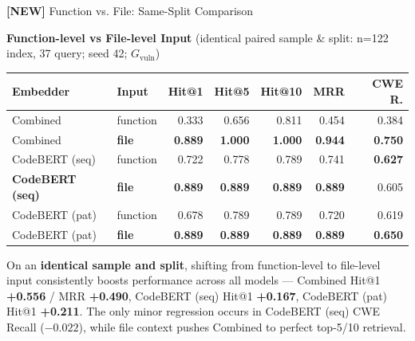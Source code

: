 \documentclass[aspectratio=169,10pt]{beamer}
\begin{document}
\begin{frame}{\textbf{[NEW]} Function vs. File: Same-Split Comparison}

  \begin{center}
    {\small\textbf{Function-level vs File-level Input} {\scriptsize(identical paired sample \& split: n=122 index, 37 query; seed 42; $G_{\mathrm{vuln}}$)}}\\[4pt]
    {\scriptsize
    \renewcommand{\arraystretch}{1.15}
    \setlength{\tabcolsep}{4pt}
    \begin{tabular}{llrrrrr}
      \toprule
      \textbf{Embedder} & \textbf{Input} & \textbf{Hit@1} & \textbf{Hit@5} & \textbf{Hit@10} & \textbf{MRR} & \textbf{CWE R.} \\
      \midrule
      Combined & function & 0.333 & 0.656 & 0.811 & 0.454 & 0.384 \\
      \rowcolor{hit!12}
      Combined & \textbf{file} & \textbf{0.889} & \textbf{1.000} & \textbf{1.000} & \textbf{0.944} & \textbf{0.750} \\
      \midrule
      CodeBERT (seq) & function & 0.722 & 0.778 & 0.789 & 0.741 & \textbf{0.627} \\
      \rowcolor{hit!12}
      \textbf{CodeBERT (seq)} & \textbf{file} & \textbf{0.889} & \textbf{0.889} & \textbf{0.889} & \textbf{0.889} & 0.605 \\
      \midrule
      CodeBERT (pat) & function & 0.678 & 0.789 & 0.789 & 0.720 & 0.619 \\
      \rowcolor{hit!12}
      CodeBERT (pat) & \textbf{file} & \textbf{0.889} & \textbf{0.889} & \textbf{0.889} & \textbf{0.889} & \textbf{0.650} \\
      \bottomrule
    \end{tabular}}
  \end{center}

  \vspace{0.35em}
  \begin{tcolorbox}[colback=hit!5, colframe=hit!70!black, boxrule=0.35pt,
    left=3pt, right=3pt, top=2pt, bottom=1pt, arc=2pt, width=\linewidth]
    \scriptsize
    On an \textbf{identical sample and split}, shifting from function-level to file-level input consistently boosts performance across all models --- Combined Hit@1 \textbf{+0.556} / MRR \textbf{+0.490}, CodeBERT (seq) Hit@1 \textbf{+0.167}, CodeBERT (pat) Hit@1 \textbf{+0.211}. The only minor regression occurs in CodeBERT (seq) CWE Recall (\textcolor{miss}{$-0.022$}), while file context pushes Combined to perfect top-5/10 retrieval.
  \end{tcolorbox}

  \vspace{0.2em}

\end{frame}
\end{document}
